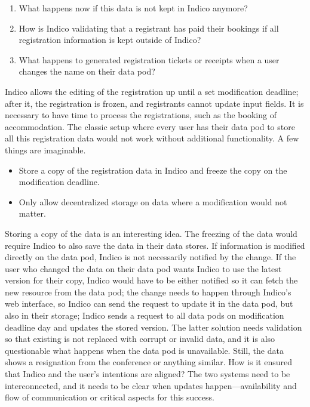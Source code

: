 \begin{enumerate}
    \item What happens now if this data is not kept in Indico anymore?
    \item How is Indico validating that a registrant has paid their bookings if all registration information is kept outside of Indico?
    \item What happens to generated registration tickets or receipts when a user changes the name on their data pod?
\end{enumerate}

Indico allows the editing of the registration up until a set modification deadline; after it, the registration is frozen, and registrants cannot update input fields. It is necessary to have time to process the registrations, such as the booking of accommodation. The classic setup where every user has their data pod to store all this registration data would not work without additional functionality. A few things are imaginable.

\begin{itemize}
    \item Store a copy of the registration data in Indico and freeze the copy on the modification deadline.
    \item Only allow decentralized storage on data where a modification would not matter.
\end{itemize}

Storing a copy of the data is an interesting idea. The freezing of the data would require Indico to also save the data in their data stores. If information is modified directly on the data pod, Indico is not necessarily notified by the change. If the user who changed the data on their data pod wants Indico to use the latest version for their copy, Indico would have to be either notified so it can fetch the new resource from the data pod; the change needs to happen through Indico’s web interface, so Indico can send the request to update it in the data pod, but also in their storage; Indico sends a request to all data pods on modification deadline day and updates the stored version. The latter solution needs validation so that existing is not replaced with corrupt or invalid data, and it is also questionable what happens when the data pod is unavailable. Still, the data shows a resignation from the conference or anything similar. How is it ensured that Indico and the user's intentions are aligned? The two systems need to be interconnected, and it needs to be clear when updates happen---availability and flow of communication or critical aspects for this success.
\vspace{0.5cm}
